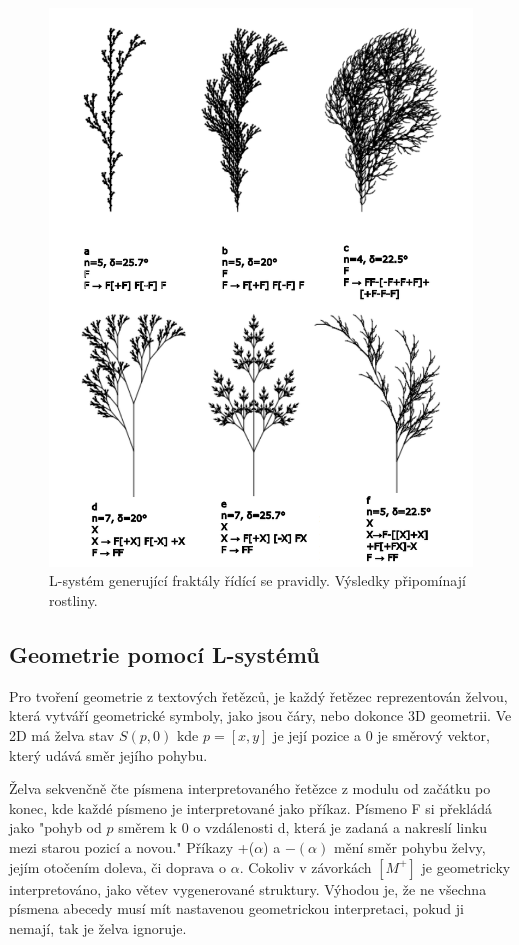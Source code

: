 \begin{figure}[H]
	\centering
	\includegraphics[scale=1]{obrazky-figures/LTrees.pdf}
	\caption{L-systém generující fraktály řídící se pravidly. Výsledky připomínají rostliny.}
	\label{lSystem}
\end{figure}

\subsection{Geometrie pomocí L-systémů}
\label{lsystemGeometry}
Pro tvoření geometrie z textových řetězců, je každý řetězec reprezentován želvou, která vytváří geometrické symboly, jako jsou čáry, nebo dokonce 3D geometrii.
Ve 2D má želva stav $S(p,0)$ kde $p=[x,y]$ je její pozice a $0$ je směrový vektor, který udává směr jejího pohybu. 

Želva sekvenčně čte písmena interpretovaného řetězce z modulu od začátku po konec, kde každé písmeno je interpretované jako příkaz. Písmeno F si překládá jako "pohyb od $p$ směrem k $0$ o vzdálenosti d, která je zadaná a nakreslí linku mezi starou pozicí a novou." Příkazy +($\alpha$) a $-(\alpha)$ mění směr pohybu želvy, jejím otočením doleva, či doprava o $\alpha$. Cokoliv v závorkách $[M^+]$ je geometricky interpretováno, jako větev vygenerované struktury. Výhodou je, že ne všechna písmena abecedy musí mít nastavenou geometrickou interpretaci, pokud ji nemají, tak je želva ignoruje.
\cite{prusinkiewicz1986graphical}

